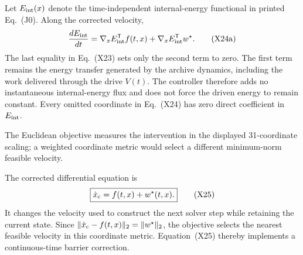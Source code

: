 \documentclass[10pt,letterpaper,twocolumn]{article}
\begin{document}
Let \(E_{\rm int}(x)\) denote the time-independent internal-energy functional
in printed Eq.~(J0).  Along the corrected velocity,
\[
\frac{dE_{\rm int}}{dt}
=\nabla_xE_{\rm int}^{\mathsf T}f(t,x)
+\nabla_xE_{\rm int}^{\mathsf T}w^\star.
\tag{X24a}
\]
The last equality in Eq.~(X23) sets only the second term to zero.  The first
term remains the energy transfer generated by the archive dynamics, including
the work delivered through the drive \(V(t)\).  The controller therefore adds
no instantaneous internal-energy flux and does not force the driven energy to
remain constant.  Every omitted coordinate in Eq.~(X24) has zero direct
coefficient in \(E_{\rm int}\).

The Euclidean objective measures the intervention in the displayed
31-coordinate scaling; a weighted coordinate metric would select a different
minimum-norm feasible velocity.

The corrected differential equation is
\[
\boxed{\dot x_{\rm c}=f(t,x)+w^\star(t,x).}
\tag{X25}
\]
It changes the velocity used to construct the next solver step while retaining
the current state.  Since
\(\lVert\dot x_{\rm c}-f(t,x)\rVert_2=\lVert w^\star\rVert_2\), the objective
selects the nearest feasible velocity in this coordinate metric.
Equation~(X25) thereby implements a continuous-time barrier correction.
\end{document}
